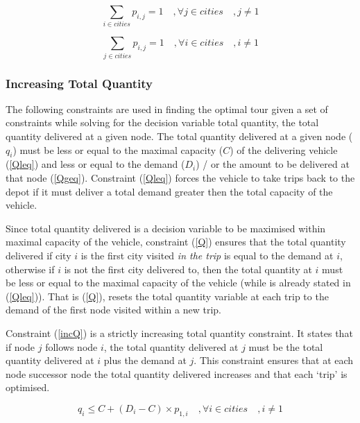 \documentclass[a4paper,11pt]{article}
\begin{document}
\begin{equation}\label{eq2}
\sum\limits_{i \in cities} p_{i,j} = 1 \quad , \forall j \in cities \quad, j\neq1
\end{equation}

\begin{equation}\label{eq3}
\sum\limits_{j \in cities} p_{i,j} = 1 \quad , \forall i \in cities\quad, i\neq1
\end{equation}



\subsubsection{Increasing Total Quantity}

The following constraints are used in finding the optimal tour given a set of constraints while solving for the decision variable total quantity, the total quantity delivered at a given node. The total quantity delivered at a given node ($q_{i}$) must be less or equal to the maximal capacity ($C$) of the delivering vehicle (\ref{Qleq}) and less or equal to the demand ($D_{i}$) / or the amount to be delivered at that node (\ref{Qgeq}). Constraint (\ref{Qleq}) forces the vehicle to take trips back to the depot if it must deliver a total demand greater then the total capacity of the vehicle.

Since total quantity delivered is a decision variable to be maximised within maximal capacity of the vehicle, constraint (\ref{Q}) ensures that the total quantity delivered if city $i$ is the first city visited \textit{in the trip} is equal to the demand at $i$, otherwise if $i$ is not the first city delivered to, then the total quantity at $i$ must be less or equal to the maximal capacity of the vehicle (while is already stated in (\ref{Qleq})). That is (\ref{Q}), resets the total quantity variable at each trip to the demand of the first node visited within a new trip. 

Constraint (\ref{incQ}) is a strictly increasing total quantity constraint. It states that if node $j$ follows node $i$, the total quantity delivered at $j$ must be the total quantity delivered at $i$ plus the demand at $j$. This constraint ensures that at each node successor node the total quantity delivered increases and that each `trip' is optimised.

\begin{equation}\label{Q}
q_{i} \leq C + (D_{i} - C) \times  p _{1,i} \quad, \forall i \in cities\quad, i\neq1
\end{equation}
\end{document}
